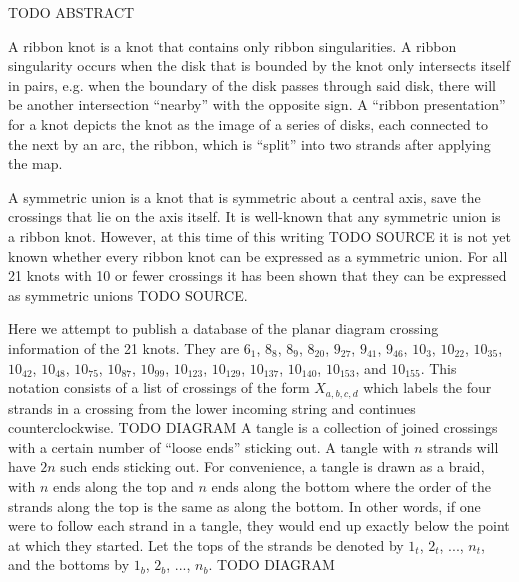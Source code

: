 

\begin{paperabstract}
TODO ABSTRACT
\end{paperabstract}
\begin{paper}
\theorems
{}
A ribbon knot is a knot that contains only ribbon singularities.
A ribbon singularity occurs when the disk that is bounded by the knot only
intersects itself in pairs, e.g. when the boundary of the disk passes through
said disk, there will be another intersection ``nearby'' with the opposite sign.
A ``ribbon presentation'' for a knot depicts the knot as the image of a series
of disks, each connected to the next by an arc, the ribbon, which is ``split''
into two strands after applying the map.

A symmetric union is a knot that is symmetric about a central axis, save the
crossings that lie on the axis itself.
It is well-known that any symmetric union is a ribbon knot.
However, at this time of this writing TODO SOURCE it is not yet known whether
every ribbon knot can be expressed as a symmetric union.
For all 21 knots with 10 or fewer crossings it has been shown that they can be
expressed as symmetric unions TODO SOURCE.

Here we attempt to publish a database of the planar diagram crossing information
of the 21 knots.
They are $6_1$, $8_8$, $8_9$, $8_{20}$, $9_{27}$, $9_{41}$, $9_{46}$, $10_3$,
$10_{22}$, $10_{35}$, $10_{42}$, $10_{48}$, $10_{75}$, $10_{87}$, $10_{99}$,
$10_{123}$, $10_{129}$, $10_{137}$, $10_{140}$, $10_{153}$, and $10_{155}$.
This notation consists of a list of crossings of the form $X_{a,b,c,d}$ which
labels the four strands in a crossing from the lower incoming string and
continues counterclockwise.
TODO DIAGRAM
A tangle is a collection of joined crossings with a certain number of ``loose
ends'' sticking out.
A tangle with $n$ strands will have $2n$ such ends sticking out.
For convenience, a tangle is drawn as a braid, with $n$ ends along the top and
$n$ ends along the bottom where the order of the strands along the top is the
same as along the bottom.
In other words, if one were to follow each strand in a tangle, they would end up
exactly below the point at which they started.
Let the tops of the strands be denoted by $1_t$, $2_t$, ..., $n_t$, and the
bottoms  by $1_b$, $2_b$, ..., $n_b$.
TODO DIAGRAM


\end{paper}
